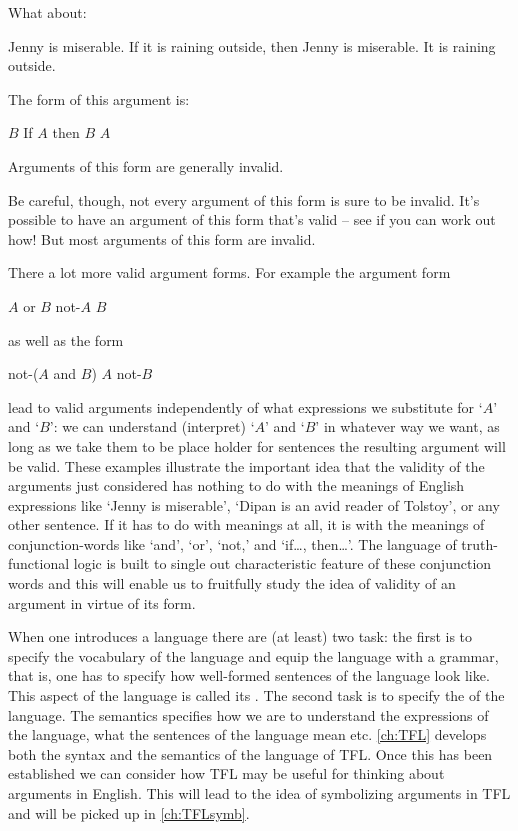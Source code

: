 What about:
	\begin{earg}
		\prem Jenny is miserable.
		\prem If it is raining outside, then Jenny is miserable.
		\conc It is raining outside.
	\end{earg}
The form of this argument is:
\begin{earg}
\prem	$B$
\prem	If $A$ then $B$
\conc $A$
\end{earg}
Arguments of this form are generally invalid.

Be careful, though, not every argument of this form is sure to be invalid.
It’s possible to have an argument of this form that’s valid – see if you can work out how!
But most arguments of this form are invalid.

There a lot more valid argument forms. For example the
argument form
	\begin{earg}
		\prem $A$ or $B$
		\prem not-$A$
		\conc $B$
	\end{earg}
as well as the form
	\begin{earg}
		\prem not-($A$ and $B$)
		\prem $A$
		\conc not-$B$
	\end{earg}
lead to valid arguments independently of what expressions we substitute for `$A$' and `$B$': we can understand (interpret) `$A$' and `$B$' in whatever way we want, as long as we take them to be place holder for sentences the resulting argument will be valid. These examples illustrate the important idea that the validity of the arguments just considered has nothing to do with the meanings of English expressions like `Jenny is miserable', `Dipan is an avid reader of Tolstoy', or any other sentence. If it has to do with meanings at all, it is with the meanings of conjunction-words like `and', `or', `not,' and `if\ldots, then\ldots'. The language of truth-functional logic is built to single out characteristic feature of these conjunction words and this will enable us to fruitfully study the idea of validity of an argument in virtue of its form.

When one introduces a language there are (at least) two task: the first is to specify the vocabulary of the language and equip the language with a grammar, that is, one has to specify how well-formed sentences of the language look like. This aspect of the language is called its . The second task is to specify the  of the language. The semantics specifies how we are to understand the expressions of the language, what the sentences of the language mean etc. \cref{ch:TFL} develops both the syntax and the semantics of the language of TFL. Once this has been established we can consider how TFL may be useful for thinking about arguments in English. This will lead to the idea of symbolizing arguments in TFL and will be picked up in \cref{ch:TFLsymb}.

